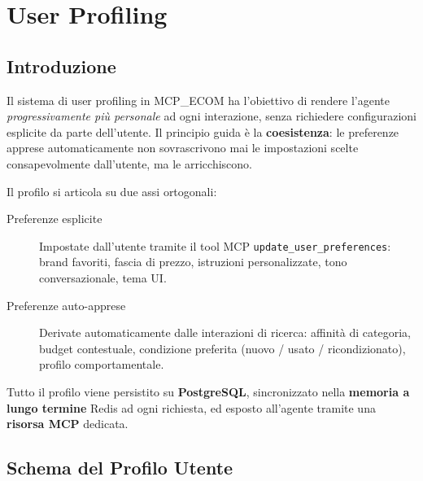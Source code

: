 
\chapter{User Profiling}
\label{chap:user-profiling}

\section{Introduzione}
\label{sec:profiling-intro}

Il sistema di user profiling in MCP\_ECOM ha l'obiettivo di rendere
l'agente \emph{progressivamente più personale} ad ogni interazione,
senza richiedere configurazioni esplicite da parte dell'utente. Il
principio guida è la \textbf{coesistenza}: le preferenze apprese
automaticamente non sovrascrivono mai le impostazioni scelte
consapevolmente dall'utente, ma le arricchiscono.

Il profilo si articola su due assi ortogonali:

\begin{description}
    \item[Preferenze esplicite] Impostate dall'utente tramite il tool MCP
        \texttt{update\_user\_preferences}: brand favoriti, fascia di
        prezzo, istruzioni personalizzate, tono conversazionale, tema UI.

    \item[Preferenze auto-apprese] Derivate automaticamente dalle
        interazioni di ricerca: affinità di categoria, budget contestuale,
        condizione preferita (nuovo / usato / ricondizionato), profilo
        comportamentale.
\end{description}

Tutto il profilo viene persistito su \textbf{PostgreSQL}, sincronizzato
nella \textbf{memoria a lungo termine} Redis ad ogni richiesta, ed esposto
all'agente tramite una \textbf{risorsa MCP} dedicata.


\section{Schema del Profilo Utente}
\label{sec:profiling-schema}

